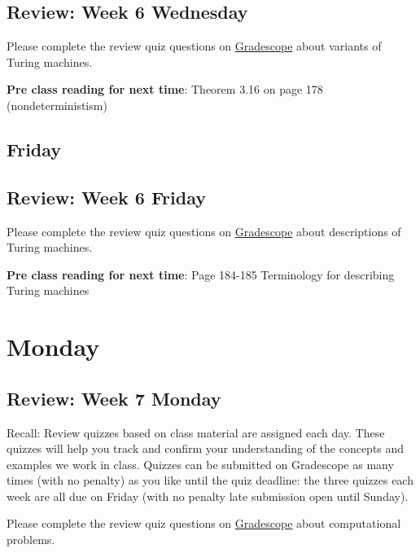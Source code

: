 

\newpage
\subsection*{Review: Week 6 Wednesday}

Please complete the review quiz questions on \href{http://gradescope.com}{Gradescope} about 
variants of Turing machines.

{\bf Pre class reading for next time}: Theorem 3.16 on page 178 (nondeterministism)



\newpage
\subsection*{Friday}



\newpage
\subsection*{Review: Week 6 Friday}


Please complete the review quiz questions on \href{http://gradescope.com}{Gradescope} about 
descriptions of Turing machines.

{\bf Pre class reading for next time}: Page 184-185 Terminology for describing Turing machines


\newpage

\section*{Monday}


    
\newpage
\subsection*{Review: Week 7 Monday}


Recall: Review quizzes based on class material are assigned each day. 
These quizzes will help you track and confirm your understanding of the concepts and examples 
we work in class. Quizzes can be submitted on Gradescope as many times (with no penalty) as 
you like until the quiz deadline: the three quizzes each week are all due on Friday (with no penalty 
late submission open until Sunday).

Please complete the review quiz questions on \href{http://gradescope.com}{Gradescope} about 
computational problems.

